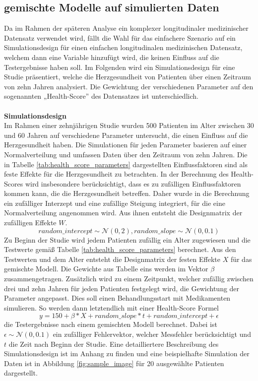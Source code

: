 \documentclass[%
thesis=student,%
coverpage=false,%
titlepage=false,%
headmarks=true, %
german,%
font=libertine, %
math=newpxtx, %
BCOR=5mm,%
coverBCOR=11mm%
]{tumbook}
\theoremstyle{break}
\begin{document}
\subsection{gemischte Modelle auf simulierten Daten}
Da im Rahmen der späteren Analyse ein komplexer longitudinaler medizinischer Datensatz verwendet wird, fällt die Wahl für das einfachere Szenario auf ein Simulationsdesign für einen einfachen longitudinalen medizinischen Datensatz, welchem dann eine Variable hinzufügt wird, die keinen Einfluss auf die Testergebnisse haben soll. Im Folgenden wird ein Simulationsdesign für eine Studie präsentiert, welche die Herzgesundheit von Patienten über einen Zeitraum von zehn Jahren analysiert. Die Gewichtung der verschiedenen Parameter auf den sogenannten „Health-Score” des Datensatzes ist unterschiedlich.\\
\\
\textbf{Simulationsdesign}\\
Im Rahmen einer zehnjährigen Studie wurden 500 Patienten im Alter zwischen 30 und 60 Jahren auf verschiedene Parameter untersucht, die einen Einfluss auf die Herzgesundheit haben. Die Simulationen für jeden Parameter basieren auf einer Normalverteilung und umfassen Daten über den Zeitraum von zehn Jahren. Die in Tabelle \ref{tab:health_score_parameters} dargestellten Einflussfaktoren sind als feste Effekte für die Herzgesundheit zu betrachten. In der Berechnung des Health-Scores wird insbesondere berücksichtigt, dass es zu zufälligen Einflussfaktoren kommen kann, die die Herzgesundheit betreffen. Daher wurde in die Berechnung ein zufälliger Interzept und eine zufällige Steigung integriert, für die eine Normalverteilung angenommen wird. Aus ihnen entsteht die Designmatrix der zufälligen Effekte $W$. $$random\_intercept \sim \mathcal{N}(0,2), random\_slope \sim \mathcal{N}(0,0.1)$$  
Zu Beginn der Studie wird jedem Patienten zufällig ein Alter zugewiesen und die Testwerte gemäß Tabelle \ref{tab:health_score_parameters} berechnet. Aus den Testwerten und dem Alter entsteht die Designmatrix der festen Effekte $X$ für das gemischte Modell. Die Gewichte  aus Tabelle eins werden im Vektor $\beta$ zusammengetragen. Zusätzlich wird zu einem Zeitpunkt, welcher zufällig zwischen drei und zehn Jahren für jeden Patienten festgelegt wird, die Gewichtung der Parameter angepasst. Dies soll einen Behandlungsstart mit Medikamenten simulieren. So werden dann letztendlich mit einer Health-Score Formel $$ y = 150 +  \beta * X + random\_slope * t + random\_intercept + \epsilon $$ die Testergebnisse nach einem gemischten Modell berechnet. Dabei ist $\epsilon \sim \mathcal{N}(0,0.1)$ ein zufälliger Fehlervektor, welcher Messfehler berücksichtigt und $t$ die Zeit nach Beginn der Studie. Eine detailliertere Beschreibung des Simulationsdesign ist im Anhang zu finden und eine beispielhafte Simulation der Daten ist in Abbildung \ref{fig:sample_image} für 20 ausgewählte Patienten dargestellt. \\
\end{document}
